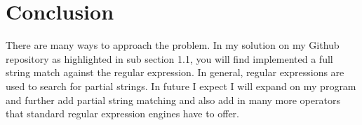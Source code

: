 \documentclass[12pt]{article}
\begin{document}
\section{Conclusion}
There are many ways to approach the problem. In my solution on my Github repository as highlighted in sub section 1.1, you will find implemented a full string match against the regular expression. In general, regular expressions are used to search for partial strings. In future I expect I will expand on my program and further add partial string matching and also add in many more operators that standard regular expression engines have to offer.

\newpage


\end{document}
